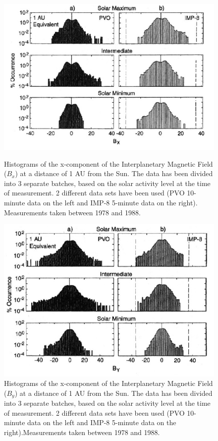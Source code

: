 \documentclass[12pt]{article}
\begin{document}
        \begin{figure}[t!]
            \begin{minipage}{0.48\textwidth}
                \centering
                \includegraphics[width=\textwidth]{fig_introduction/russellBX.png}
                \caption{Histograms of the x-component of the Interplanetary Magnetic Field ($B_x$) at a distance of 1 AU from the Sun\cite{2001russell}. The data has been divided into 3 separate batches, based on the solar activity level at the time of measurement. 2 different data sets have been used (PVO 10-minute data on the left and IMP-8 5-minute data on the right). Measurements taken between 1978 and 1988.}
                \label{fig:russellBX}
            \end{minipage}
            \hfill
            \begin{minipage}{0.48\textwidth}
                \centering
                \includegraphics[width=\textwidth]{fig_introduction/russellBY.png}
                \caption{Histograms of the x-component of the Interplanetary Magnetic Field ($B_y$) at a distance of 1 AU from the Sun\cite{2001russell}. The data has been divided into 3 separate batches, based on the solar activity level at the time of measurement. 2 different data sets have been used (PVO 10-minute data on the left and IMP-8 5-minute data on the right).Measurements taken between 1978 and 1988.}
                \label{fig:russellBY}
            \end{minipage}
        \end{figure}
\end{document}
